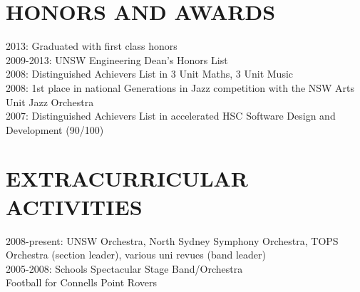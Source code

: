 \documentclass{res}
\begin{document}
\begin{resume}
 
\section{HONORS AND AWARDS}          
    2013: Graduated with first class honors \\
    2009-2013: UNSW Engineering Dean's Honors List \\
    2008: Distinguished Achievers List in 3 Unit Maths, 3 Unit Music \\
    2008: 1st place in national Generations in Jazz competition with the NSW Arts Unit Jazz Orchestra \\
    2007: Distinguished Achievers List in accelerated HSC Software Design and Development (90/100)
 
\section{EXTRACURRICULAR ACTIVITIES}          
    2008-present: UNSW Orchestra, North Sydney Symphony Orchestra, TOPS Orchestra (section leader), various uni revues (band leader) \\
    2005-2008: Schools Spectacular Stage Band/Orchestra \\
    Football for Connells Point Rovers
 
\end{resume}
\end{document}
